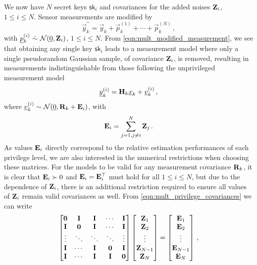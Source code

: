 We now have $N$ secret keys $\mathsf{sk}_i$ and covariances for the added noises ${{\mathbf{Z}}}_i$, $1\leq i \leq N$. Sensor measurements are modified by
\begin{equation}\label{eqn:mult_modified_measurement}
   \vec{y}_k^{\prime\prime} = \vec{y}_k + \vec{p}^{(1)}_k + \cdots + \vec{p}^{(N)}_k\,,
\end{equation}
with $\vec{p}^{(i)}_k\ \dot{\sim}\ \mathcal{N}(\vec{0}, \mat{Z}_i)$, $1\leq i \leq N$. From \eqref{eqn:mult_modified_measurement}, we see that obtaining any single key $\mathsf{sk}_i$ leads to a measurement model where only a single pseudorandom Gaussian sample, of covariance ${{\mathbf{Z}}}_i$, is removed, resulting in measurements indistinguishable from those following the unprivileged measurement model
\begin{equation}
   {\underline{y}}_k^{(i)} = {{\mathbf{H}}}_k{\underline{x}}_k + {\underline{v}}^{(i)}_k\,,
\end{equation}
where ${\underline{v}}^{(i)}_k\sim \mathcal{N}({\underline{0}},{{\mathbf{R}}}_k+{{\mathbf{E}}}_i)$, with
\begin{equation}\label{eqn:mult_privilege_covariances}
   {\ensuremath{{\mathbf{E}}}}_i = \sum^N_{j=1,j \neq i}{{\mathbf{Z}}}_j\,.
\end{equation}
As values ${{\mathbf{E}}}_i$ directly correspond to the relative estimation performances of each privilege level, we are also interested in the numerical restrictions when choosing these matrices. For the models to be valid for any measurement covariance ${{\mathbf{R}}}_k$, it is clear that ${{\mathbf{E}}}_i\succ 0$ and ${{\mathbf{E}}}_i={{\mathbf{E}}}_i^\top$ must hold for all $1\leq i\leq N$, but due to the dependence of ${{\mathbf{Z}}}_i$, there is an additional restriction required to ensure all values of ${{\mathbf{Z}}}_i$ remain valid covariances as well. From \eqref{eqn:mult_privilege_covariances} we can write
\begin{equation}
   \begin{bmatrix}
      {\ensuremath{{\mathbf{0}}}} & {{\mathbf{I}}} & {{\mathbf{I}}} & \cdots & {{\mathbf{I}}}\\
      {{\mathbf{I}}} & {{\mathbf{0}}} & {{\mathbf{I}}} & \cdots & {{\mathbf{I}}}\\
      \vdots & \ddots & \ddots & \ddots & \vdots\\
      {{\mathbf{I}}} & \cdots & {{\mathbf{I}}} & {{\mathbf{0}}} & {{\mathbf{I}}}\\
      {{\mathbf{I}}} & \cdots & {{\mathbf{I}}} & {{\mathbf{I}}} & {{\mathbf{0}}}
   \end{bmatrix}
   \begin{bmatrix}
      {\ensuremath{{\mathbf{Z}}}}_1\\
      {{\mathbf{Z}}}_2\\
      \vdots\\
      {{\mathbf{Z}}}_{N-1}\\
      {{\mathbf{Z}}}_N
   \end{bmatrix}
   =
   \begin{bmatrix}
      {\ensuremath{{\mathbf{E}}}}_1\\
      {{\mathbf{E}}}_2\\
      \vdots\\
      {{\mathbf{E}}}_{N-1}\\
      {{\mathbf{E}}}_N
   \end{bmatrix}\,,
\end{equation}
